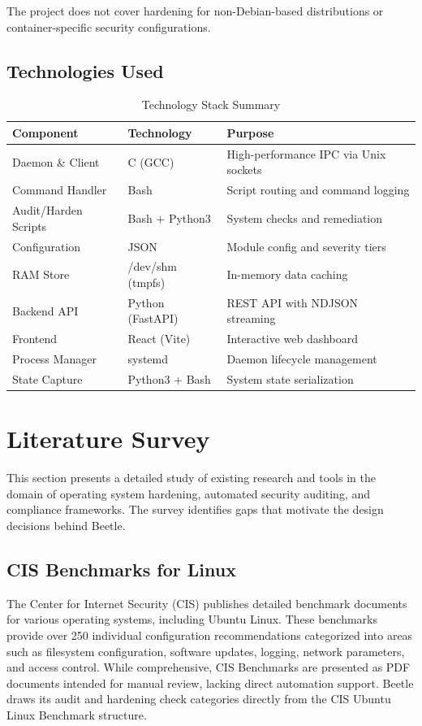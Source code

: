 The project does not cover hardening for non-Debian-based distributions or container-specific security configurations.

\subsection{Technologies Used}

\begin{table}[H]
\centering
\caption{Technology Stack Summary}
\begin{tabular}{|p{4cm}|p{4cm}|p{5cm}|}
\hline
\textbf{Component} & \textbf{Technology} & \textbf{Purpose} \\
\hline
Daemon \& Client & C (GCC) & High-performance IPC via Unix sockets \\
\hline
Command Handler & Bash & Script routing and command logging \\
\hline
Audit/Harden Scripts & Bash + Python3 & System checks and remediation \\
\hline
Configuration & JSON & Module config and severity tiers \\
\hline
RAM Store & /dev/shm (tmpfs) & In-memory data caching \\
\hline
Backend API & Python (FastAPI) & REST API with NDJSON streaming \\
\hline
Frontend & React (Vite) & Interactive web dashboard \\
\hline
Process Manager & systemd & Daemon lifecycle management \\
\hline
State Capture & Python3 + Bash & System state serialization \\
\hline
\end{tabular}
\label{tab:techstack}
\end{table}

\pagebreak
\section{Literature Survey}

This section presents a detailed study of existing research and tools in the domain of operating system hardening, automated security auditing, and compliance frameworks. The survey identifies gaps that motivate the design decisions behind Beetle.

\subsection{CIS Benchmarks for Linux}
The Center for Internet Security (CIS) publishes detailed benchmark documents for various operating systems, including Ubuntu Linux. These benchmarks provide over 250 individual configuration recommendations categorized into areas such as filesystem configuration, software updates, logging, network parameters, and access control. While comprehensive, CIS Benchmarks are presented as PDF documents intended for manual review, lacking direct automation support. Beetle draws its audit and hardening check categories directly from the CIS Ubuntu Linux Benchmark structure.


